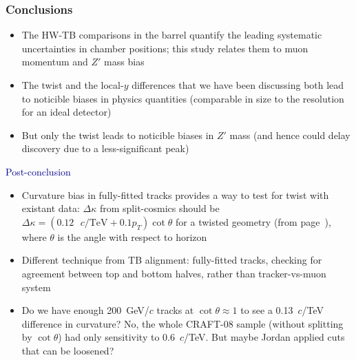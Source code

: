 \documentclass[compress]{beamer}
\begin{document}


\begin{frame}
\frametitle{Conclusions}
\begin{itemize}
\item The HW-TB comparisons in the barrel quantify the leading
systematic uncertainties in chamber positions; this study relates them
to muon momentum and $Z'$ mass bias
\item The twist and the local-$y$ differences that we have been
discussing both lead to noticible biases in physics quantities
(comparable in size to the resolution for an ideal detector)
\item But only the twist leads to noticible biases in $Z'$ mass (and hence could delay discovery due to a less-significant peak)
\end{itemize}

\vfill
\hspace{-0.83 cm} \textcolor{darkblue}{\Large Post-conclusion}

\scriptsize

\vspace{0.1 cm}
\begin{itemize}
\item Curvature bias in fully-fitted tracks provides a way to test for twist with existant data: $\Delta\kappa$ from split-cosmics should be $\Delta\kappa = (0.12\mbox{ $c$/TeV} + 0.1 p_T) \cot\theta$ for a twisted geometry (from page~\pageref{page:summary}), where $\theta$ is the angle with respect to horizon
\item Different technique from TB alignment: fully-fitted tracks, checking for agreement between top and bottom halves, rather than tracker-vs-muon system
\item Do we have enough 200~GeV/$c$ tracks at $\cot\theta \approx 1$ to see a 0.13~$c$/TeV difference in curvature?  No, the whole CRAFT-08 sample (without splitting by $\cot\theta$) had only sensitivity to 0.6~$c$/TeV.  But maybe Jordan applied cuts that can be loosened?
\end{itemize}
\label{numpages}
\end{frame}
\end{document}

